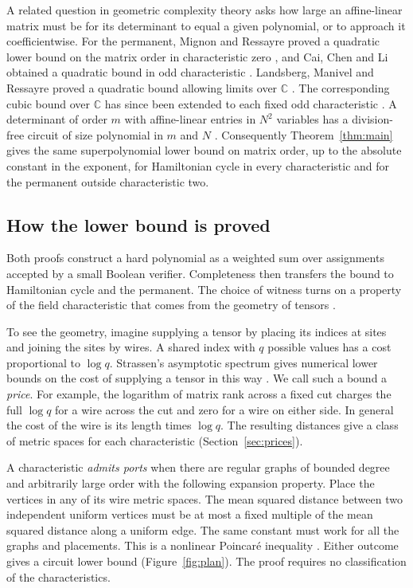 A related question in geometric complexity theory \cite{MS} asks how
large an affine-linear matrix must be for its determinant to equal a
given polynomial, or to approach it coefficientwise. For the permanent,
Mignon and Ressayre proved a quadratic lower bound on the matrix order
in characteristic zero \cite{MignonRessayre}, and Cai, Chen and Li
obtained a quadratic bound in odd characteristic \cite{CaiChenLi}.
Landsberg, Manivel and Ressayre proved a quadratic bound allowing
limits over $\mathbb C$ \cite{LandsbergManivelRessayre}.
The corresponding cubic bound over $\mathbb C$ \cite{cubic-bdc} has
since been extended to each fixed odd characteristic \cite{Sheshadri}.
A determinant of order $m$ with affine-linear entries in $N^2$
variables has a division-free circuit of size polynomial in $m$ and
$N$ \cite{Berkowitz}. Consequently Theorem~\ref{thm:main} gives the
same superpolynomial lower bound on matrix order, up to the absolute
constant in the exponent, for Hamiltonian cycle in every characteristic
and for the permanent outside characteristic two.

\subsection{How the lower bound is proved}

Both proofs construct a hard polynomial as a weighted sum over
assignments accepted by a small Boolean verifier. Completeness
then transfers the bound to Hamiltonian cycle and the permanent. The
choice of witness turns on a property of the field characteristic that
comes from the geometry of tensors \cite{oaG}.

To see the geometry, imagine supplying a tensor by placing its indices
at sites and joining the sites by wires. A shared index with $q$
possible values has a cost proportional to $\log q$. Strassen's
asymptotic spectrum gives numerical lower bounds on the cost of
supplying a tensor in this way \cite{Strassen}. We call such a bound a
\emph{price}. For example, the logarithm of matrix rank across a fixed
cut charges the full $\log q$ for a wire across the cut and zero for a
wire on either side. In general the cost of the wire is its length
times $\log q$. The resulting distances give a class of metric spaces
for each characteristic (Section~\ref{sec:prices}).

A characteristic \emph{admits ports} when there are regular graphs of
bounded degree and arbitrarily large order with the following expansion
property. Place the vertices in any of its wire metric spaces. The
mean squared distance between two independent uniform vertices must be
at most a fixed multiple of the mean squared distance along a uniform
edge. The same constant must work for all the graphs and placements.
This is a nonlinear Poincar\'e inequality
\cite{MendelNaor,MendelNaorHadamard,EMN}. Either outcome gives a
circuit lower bound (Figure~\ref{fig:plan}). The proof requires no
classification of the characteristics.

